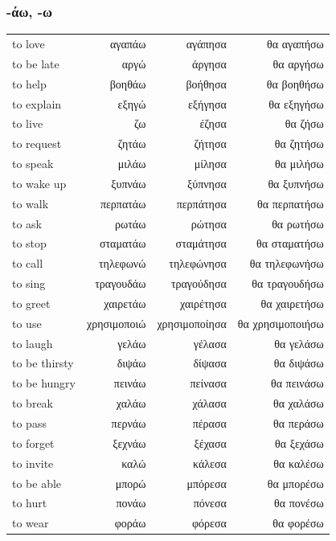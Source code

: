 \documentclass[12pt]{article}
\newcommand{\my}[1]{\textcolor{gray!80!white}{#1}}
\newenvironment{page}{\clearpage\normalsize\null\vfill}{\vfill\null}
\begin{document}
    \begin{page}
        \subsubsection*{-άω, -ω}
        \scriptsize
        \begin{tabular}{lrrr}
            \my{to love} & αγαπάω & αγάπησα & θα αγαπήσω \\
            \my{to be late} & αργώ & άργησα & θα αργήσω \\
            \my{to help} & βοηθάω & βοήθησα & θα βοηθήσω \\
            \my{to explain} & εξηγώ & εξήγησα & θα εξηγήσω \\
            \my{to live} & ζω & έζησα & θα ζήσω \\
            \my{to request} & ζητάω & ζήτησα & θα ζητήσω \\
            \my{to speak} & μιλάω & μίλησα & θα μιλήσω \\
            \my{to wake up} & ξυπνάω & ξύπνησα & θα ξυπνήσω \\
            \my{to walk} & περπατάω & περπάτησα & θα περπατήσω \\
            \my{to ask} & ρωτάω & ρώτησα & θα ρωτήσω \\
            \my{to stop} & σταματάω & σταμάτησα & θα σταματήσω \\
            \my{to call} & τηλεφωνώ & τηλεφώνησα & θα τηλεφωνήσω \\
            \my{to sing} & τραγουδάω & τραγούδησα & θα τραγουδήσω \\
            \my{to greet} & χαιρετάω & χαιρέτησα & θα χαιρετήσω \\
            \my{to use} & χρησιμοποιώ & χρησιμοποίησα & θα χρησιμοποιήσω \\[2mm]
            \my{to laugh} & γελάω & γέλασα & θα γελάσω \\
            \my{to be thirsty} & διψάω & δίψασα & θα διψάσω \\
            \my{to be hungry} & πεινάω & πείνασα & θα πεινάσω \\
            \my{to break} & χαλάω & χάλασα & θα χαλάσω \\
            \my{to pass} & περνάω & πέρασα & θα περάσω \\
            \my{to forget} & ξεχνάω & ξέχασα & θα ξεχάσω \\[2mm]
            \my{to invite} & καλώ & κάλεσα & θα καλέσω \\
            \my{to be able} & μπορώ & μπόρεσα & θα μπορέσω \\
            \my{to hurt} & πονάω & πόνεσα & θα πονέσω \\
            \my{to wear} & φοράω & φόρεσα & θα φορέσω \\
        \end{tabular}
    \end{page}
\end{document}
